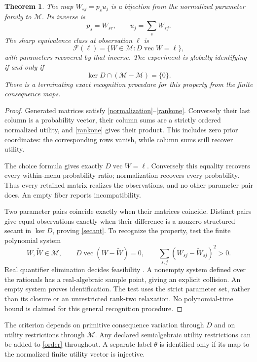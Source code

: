 \documentclass[11pt]{article}
\newtheorem{theorem}{Theorem}
\newcommand{\M}{\mathcal M}
\begin{document}
\begin{theorem}\label{identification}
The map $W_{sj}=p_su_j$ is a bijection from the normalized parameter family to $\M$. Its inverse is
\[
 p_s=W_{sr},\qquad u_j=\sum_sW_{sj}.
\]
The sharp equivalence class at observation $\ell$ is
\begin{equation}\label{fiber}
 \mathcal F(\ell)=\{W\in\M:D\operatorname{vec}W=\ell\},
\end{equation}
with parameters recovered by that inverse. The experiment is globally identifying if and only if
\begin{equation}\label{secant}
 \ker D\cap(\M-\M)=\{0\}.
\end{equation}
There is a terminating exact recognition procedure for this property from the finite consequence maps.
\end{theorem}
\begin{proof}
Generated matrices satisfy \eqref{normalization}--\eqref{rankone}. Conversely their last column is a probability vector, their column sums are a strictly ordered normalized utility, and \eqref{rankone} gives their product. This includes zero prior coordinates: the corresponding rows vanish, while column sums still recover utility.

The choice formula gives exactly $D\operatorname{vec}W=\ell$. Conversely this equality recovers every within-menu probability ratio; normalization recovers every probability. Thus every retained matrix realizes the observations, and no other parameter pair does. An empty fiber reports incompatibility.

Two parameter pairs coincide exactly when their matrices coincide. Distinct pairs give equal observations exactly when their difference is a nonzero structured secant in $\ker D$, proving \eqref{secant}. To recognize the property, test the finite polynomial system
\[
 W,\widetilde W\in\M,\qquad
 D\operatorname{vec}(W-\widetilde W)=0,\qquad
 \sum_{s,j}(W_{sj}-\widetilde W_{sj})^2>0.
\]
Real quantifier elimination decides feasibility \cite[Sections 13.1, 14.2]{BPR}. A nonempty system defined over the rationals has a real-algebraic sample point, giving an explicit collision. An empty system proves identification. The test uses the strict parameter set, rather than its closure or an unrestricted rank-two relaxation. No polynomial-time bound is claimed for this general recognition procedure.
\end{proof}

The criterion depends on primitive consequence variation through $D$ and on utility restrictions through $\M$. Any declared semialgebraic utility restrictions can be added to \eqref{order} throughout. A separate label $\theta$ is identified only if its map to the normalized finite utility vector is injective.
\end{document}
